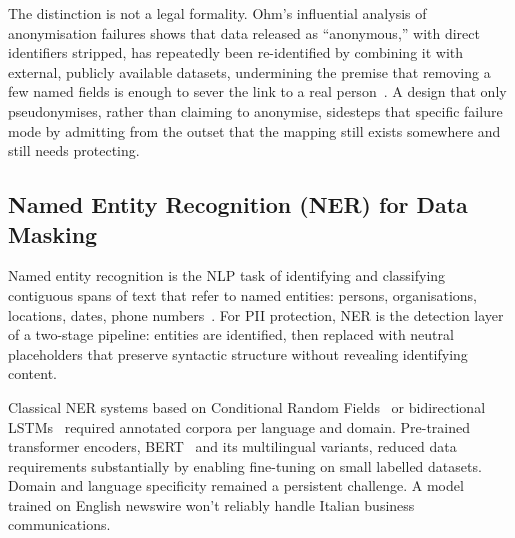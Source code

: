 The distinction is not a legal formality. Ohm's influential analysis of anonymisation failures shows that data released as ``anonymous,'' with direct identifiers stripped, has repeatedly been re-identified by combining it with external, publicly available datasets, undermining the premise that removing a few named fields is enough to sever the link to a real person~\cite{ohm2010broken}. A design that only pseudonymises, rather than claiming to anonymise, sidesteps that specific failure mode by admitting from the outset that the mapping still exists somewhere and still needs protecting.

\subsection{Named Entity Recognition (NER) for Data Masking}
\label{subsec:background_ner_masking}

Named entity recognition is the NLP task of identifying and classifying contiguous spans of text that refer to named entities: persons, organisations, locations, dates, phone numbers~\cite{nadeau2007survey}. For PII protection, NER is the detection layer of a two-stage pipeline: entities are identified, then replaced with neutral placeholders that preserve syntactic structure without revealing identifying content.

Classical NER systems based on Conditional Random Fields~\cite{lafferty2001crf} or bidirectional LSTMs~\cite{huang2015bilstmcrf} required annotated corpora per language and domain. Pre-trained transformer encoders, BERT~\cite{devlin2019bert} and its multilingual variants, reduced data requirements substantially by enabling fine-tuning on small labelled datasets. Domain and language specificity remained a persistent challenge. A model trained on English newswire won't reliably handle Italian business communications.

